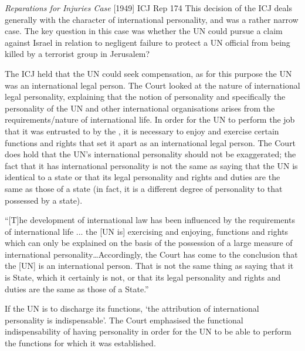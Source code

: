 \begin{casedetails}{\textit{Reparations for Injuries Case} [1949] ICJ Rep 174}
    \flushleft
    This decision of the ICJ deals generally with the character of international personality, and was a rather narrow case. The key question in this case was whether the UN could pursue a claim against Israel in relation to negligent failure to protect a UN official from being killed by a terrorist group in Jerusalem?

    \vspace{\baselineskip}

    The ICJ held that the UN could seek compensation, as for this purpose the UN was an international legal person. The Court looked at the nature of international legal personality, explaining that the notion of personality and specifically the personality of the UN and other international organisations arises from the requirements/nature of international life. In order for the UN to perform the job that it was entrusted to by the , it is necessary to enjoy and exercise certain functions and rights that set it apart as an international legal person. The Court does hold that the UN's international personality should not be exaggerated; the fact that it has international personality is not the same as saying that the UN is identical to a state or that its legal personality and rights and duties are the same as those of a state (in fact, it is a different degree of personality to that possessed by a state).

    \vspace{\baselineskip}

    ``[T]he development of international law has been influenced by the requirements of international life ... the [UN is] exercising and enjoying, functions and rights which can only be explained on the basis of the possession of a large measure of international personality…Accordingly, the Court has come to the conclusion that the [UN] is an international person. That is not the same thing as saying that it is State, which it certainly is not, or that its legal personality and rights and duties are the same as those of a State.''

    \vspace{\baselineskip}

    If the UN is to discharge its functions, `the attribution of international personality is indispensable'. The Court emphasised the functional indispensability of having personality in order for the UN to be able to perform the functions for which it was established.
\end{casedetails}

